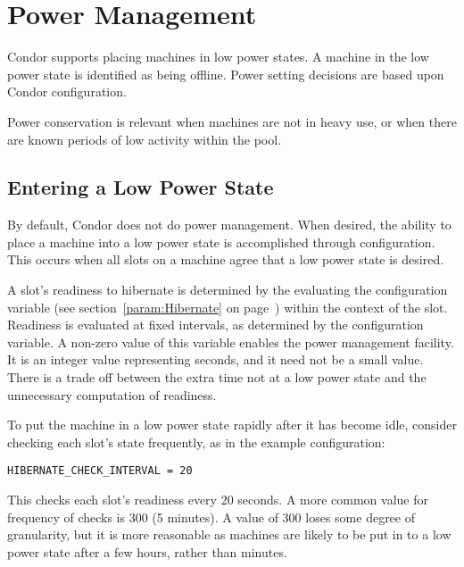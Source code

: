 \section{\label{sec:power-man}Power Management}

Condor supports placing machines in low power states.
A machine in the low power state is identified as being offline.
Power setting decisions are based upon  
Condor configuration.

Power conservation is relevant when machines are not in heavy use,
or when there are known periods of low activity within the pool.

\subsection{Entering a Low Power State}

By default, Condor does not do power management.
When desired, the ability to place a machine into a low
power state is accomplished through configuration.
This occurs when all slots on a machine agree that a low power state
is desired.

A slot's readiness to hibernate is determined by the 
evaluating the  configuration variable
(see section~\ref{param:Hibernate} on page~\pageref{param:Hibernate})
within the context of the slot.
Readiness is evaluated at fixed intervals, 
as determined by the  configuration variable.
A non-zero value of this variable enables the power management facility.
It is an integer value representing seconds,
and it need not be a small value.
There is a trade off between the extra time not at a low power state
and the unnecessary computation of readiness.  

To put the machine in a low power state rapidly
after it has become idle, consider checking each slot's state frequently,
as in the example configuration:

\begin{verbatim}
HIBERNATE_CHECK_INTERVAL = 20
\end{verbatim}

This checks each slot's readiness every 20 seconds.
A more common value for frequency of checks is 300 (5 minutes).
A value of 300 loses some degree of granularity,
but it is more reasonable as machines are likely to be put 
in to a low power state after a few hours, rather than minutes.
 
